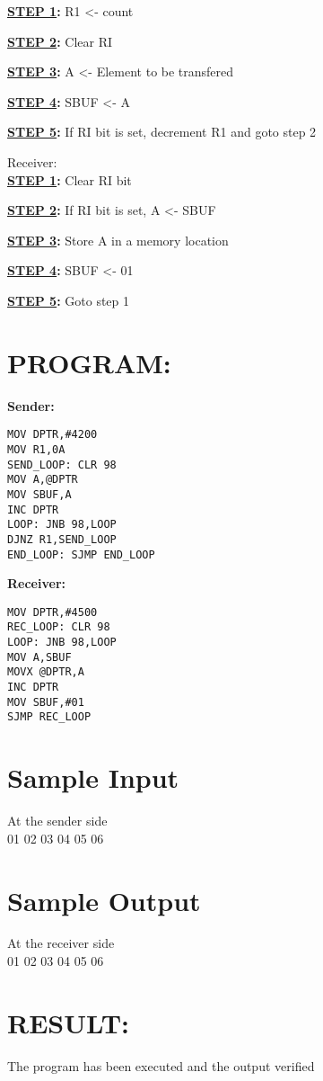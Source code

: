 \textbf{\underline{STEP 1}:} R1 <- count

\textbf{\underline{STEP 2}:} Clear RI

\textbf{\underline{STEP 3}:} A <- Element to be transfered

\textbf{\underline{STEP 4}:} SBUF <- A

\textbf{\underline{STEP 5}:} If RI bit is set, decrement R1 and goto step 2

\large{Receiver:}\\

\textbf{\underline{STEP 1}:} Clear RI bit

\textbf{\underline{STEP 2}:} If RI bit is set, A <- SBUF

\textbf{\underline{STEP 3}:} Store A in a memory location

\textbf{\underline{STEP 4}:} SBUF <- 01

\textbf{\underline{STEP 5}:} Goto step 1


\section*{PROGRAM:}
\textbf{Sender:}
\begin{lstlisting}
MOV DPTR,#4200
MOV R1,0A
SEND_LOOP: CLR 98 
MOV A,@DPTR
MOV SBUF,A
INC DPTR
LOOP: JNB 98,LOOP
DJNZ R1,SEND_LOOP
END_LOOP: SJMP END_LOOP
\end{lstlisting}

\vspace{20pt}

\textbf{Receiver:}
\begin{lstlisting}
MOV DPTR,#4500
REC_LOOP: CLR 98
LOOP: JNB 98,LOOP
MOV A,SBUF
MOVX @DPTR,A
INC DPTR
MOV SBUF,#01
SJMP REC_LOOP
\end{lstlisting}


\section*{Sample Input}
At the sender side\\
01 02 03 04 05 06

\section*{Sample Output}
At the receiver side\\
01 02 03 04 05 06

\section*{RESULT:}
The program has been executed and the output verified
%
%
%
%
